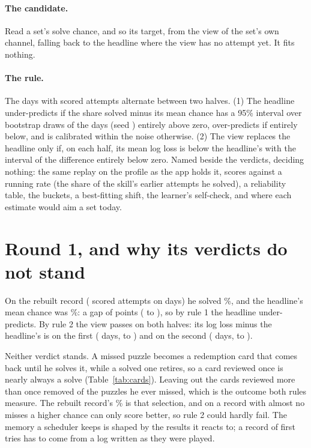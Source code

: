 \documentclass[11pt]{article}
\begin{document}
\paragraph{The candidate.} Read a set's solve chance, and so its target, from the view of the set's
own channel, falling back to the headline where the view has no attempt yet. It fits nothing.

\paragraph{The rule.} The days with scored attempts alternate between two halves. (1) The headline
under-predicts if the share solved minus its mean chance has a 95\% interval over \Draws{}
bootstrap draws of the days (seed \Seed) entirely above zero, over-predicts if entirely below, and
is calibrated within the noise otherwise. (2) The view replaces the headline only if, on each
half, its mean log loss is below the headline's with the interval of the difference entirely below
zero. Named beside the verdicts, deciding nothing: the same replay on the profile as the app holds
it, scores against a running rate (the share of the skill's earlier attempts he solved), a
reliability table, the buckets, a best-fitting shift, the learner's self-check, and where each
estimate would aim a set today.

\section{Round 1, and why its verdicts do not stand}

On the rebuilt record (\RAttempts{} scored attempts on \RDays{} days) he solved \RSolved\%, and the
headline's mean chance was \RHead\%: a gap of \RGap{} points (\RGapLo{} to \RGapHi), so by rule 1
the headline under-predicts. By rule 2 the view passes on both halves: its log loss minus the
headline's is \HOneDiff{} on the first (\HOneDays{} days, \HOneLo{} to \HOneHi) and \HTwoDiff{} on
the second (\HTwoDays{} days, \HTwoLo{} to \HTwoHi).

Neither verdict stands. A missed puzzle becomes a redemption card that comes back until he solves
it, while a solved one retires, so a card reviewed once is nearly always a solve
(Table~\ref{tab:cards}). Leaving out the cards reviewed more than once removed \MoreWithMiss{} of
the \AllWithMiss{} puzzles he ever missed, which is the outcome both rules measure. The rebuilt
record's \RSolved\% is that selection, and on a record with almost no misses a higher chance can
only score better, so rule 2 could hardly fail. The memory a scheduler keeps is shaped by the results
it reacts to; a record of first tries has to come from a log written as they were played.
\end{document}
